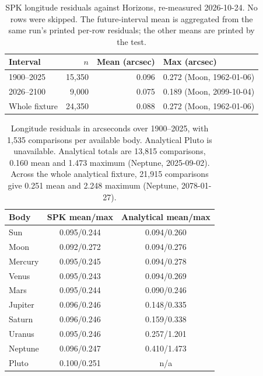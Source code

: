 \documentclass[11pt]{article}
\begin{document}
\begin{table}[!htbp]
\centering
\small
\begin{tabular}{@{}lrrl@{}}
\toprule
Interval & $n$ & Mean (arcsec) & Max (arcsec) \\
\midrule
1900--2025 & 15,350 & 0.096 & 0.272 (Moon, 1962-01-06) \\
2026--2100 & 9,000 & 0.075 & 0.189 (Moon, 2099-10-04) \\
Whole fixture & 24,350 & 0.088 & 0.272 (Moon, 1962-01-06) \\
\bottomrule
\end{tabular}
\caption{SPK longitude residuals against Horizons, re-measured 2026-10-24. No rows were skipped. The future-interval mean is aggregated from the same run's printed per-row residuals; the other means are printed by the test.}
\label{tab:oracle}
\end{table}

\begin{table}[!htbp]
\centering
\small
\begin{tabular}{@{}lcc@{}}
\toprule
Body & SPK mean/max & Analytical mean/max \\
\midrule
Sun & 0.095/0.244 & 0.094/0.260 \\
Moon & 0.092/0.272 & 0.094/0.276 \\
Mercury & 0.095/0.245 & 0.094/0.278 \\
Venus & 0.095/0.243 & 0.094/0.269 \\
Mars & 0.095/0.244 & 0.090/0.246 \\
Jupiter & 0.096/0.246 & 0.148/0.335 \\
Saturn & 0.096/0.246 & 0.159/0.338 \\
Uranus & 0.095/0.246 & 0.257/1.201 \\
Neptune & 0.096/0.247 & 0.410/1.473 \\
Pluto & 0.100/0.251 & n/a \\
\bottomrule
\end{tabular}
\caption{Longitude residuals in arcseconds over 1900--2025, with 1,535 comparisons per available body. Analytical Pluto is unavailable. Analytical totals are 13,815 comparisons, 0.160 mean and 1.473 maximum (Neptune, 2025-09-02). Across the whole analytical fixture, 21,915 comparisons give 0.251 mean and 2.248 maximum (Neptune, 2078-01-27).}
\label{tab:perbody}
\end{table}
\end{document}
